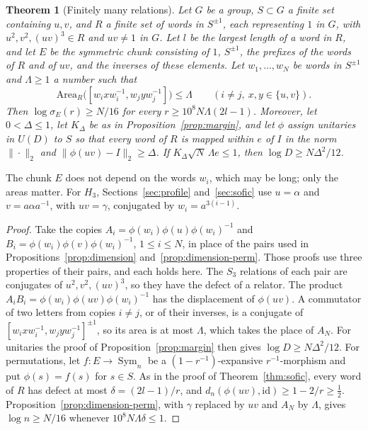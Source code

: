 \documentclass[11pt,a4paper]{article}
\theoremstyle{plain}
\newtheorem{theorem}{Theorem}[section]
\theoremstyle{definition}
\theoremstyle{remark}
\DeclareMathOperator{\Sym}{Sym}
\begin{document}
\begin{theorem}[Finitely many relations]\label{thm:certificate}
Let $G$ be a group, $S\subset G$ a finite set containing $u,v$, and $R$ a finite set of words in $S^{\pm1}$, each representing $1$ in $G$,
with $u^2,v^2,(uv)^3\in R$ and $uv\ne1$ in $G$. Let $l$ be the largest length of a word in $R$, and let $E$ be the symmetric chunk consisting
of $1$, $S^{\pm1}$, the prefixes of the words of $R$ and of $uv$, and the inverses of these elements. Let $w_1,\dots,w_N$ be words in
$S^{\pm1}$ and $\Lambda\ge1$ a number such that
\[
\mathrm{Area}_R\bigl([w_ixw_i^{-1},w_jyw_j^{-1}]\bigr)\le\Lambda\qquad(i\ne j,\ x,y\in\{u,v\}).
\]
Then $\log\sigma_E(r)\ge N/16$ for every $r\ge10^8N\Lambda(2l-1)$. Moreover, let $0<\Delta\le1$, let $K_\Delta$ be as in
Proposition~\ref{prop:margin}, and let $\phi$ assign unitaries in $U(D)$ to $S$ so that every word of $R$ is mapped within $e$ of $I$ in the norm $\|\cdot\|_2$ and
$\|\phi(uv)-I\|_2\ge\Delta$. If $K_\Delta\sqrt N\,\Lambda e\le1$, then $\log D\ge N\Delta^2/12$.
\end{theorem}

The chunk $E$ does not depend on the words $w_i$, which may be long; only the areas matter. For $H_3$, Sections~\ref{sec:profile}
and~\ref{sec:sofic} use $u=\alpha$ and $v=a\alpha a^{-1}$, with $uv=\gamma$, conjugated by $w_i=a^{3(i-1)}$.

\begin{proof}
Take the copies $A_i=\phi(w_i)\phi(u)\phi(w_i)^{-1}$ and $B_i=\phi(w_i)\phi(v)\phi(w_i)^{-1}$, $1\le i\le N$, in place of the pairs used in
Propositions~\ref{prop:dimension} and~\ref{prop:dimension-perm}. Those proofs use three properties of their pairs, and each holds here. The
$S_3$ relations of each pair are conjugates of $u^2,v^2,(uv)^3$, so they have the defect of a relator. The product
$A_iB_i=\phi(w_i)\phi(uv)\phi(w_i)^{-1}$ has the displacement of $\phi(uv)$. A commutator of two letters from copies $i\ne j$, or of their
inverses, is a conjugate of $[w_ixw_i^{-1},w_jyw_j^{-1}]^{\pm1}$, so its area is at most $\Lambda$, which takes the place of $A_N$. For unitaries
the proof of Proposition~\ref{prop:margin} then gives $\log D\ge N\Delta^2/12$. For permutations, let $f:E\to\Sym_n$ be a
$(1-r^{-1})$-expansive $r^{-1}$-morphism and put $\phi(s)=f(s)$ for $s\in S$. As in the proof of Theorem~\ref{thm:sofic}, every word of $R$
has defect at most $\delta=(2l-1)/r$, and $d_n(\phi(uv),\mathrm{id})\ge1-2/r\ge\frac12$. Proposition~\ref{prop:dimension-perm}, with $\gamma$
replaced by $uv$ and $A_N$ by $\Lambda$, gives $\log n\ge N/16$ whenever $10^8N\Lambda\delta\le1$.
\end{proof}
\end{document}
